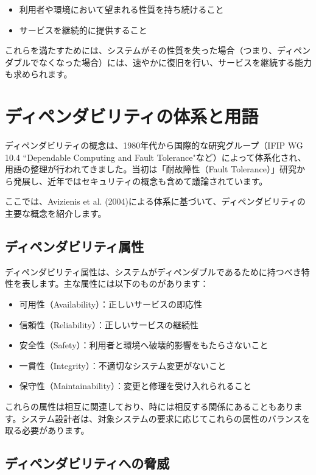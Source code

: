 \begin{itemize}
\item 利用者や環境において望まれる性質を持ち続けること
\item サービスを継続的に提供すること
\end{itemize}

これらを満たすためには、システムがその性質を失った場合（つまり、ディペンダブルでなくなった場合）には、速やかに復旧を行い、サービスを継続する能力も求められます。

\section{ディペンダビリティの体系と用語}

ディペンダビリティの概念は、1980年代から国際的な研究グループ（IFIP WG 10.4 ``Dependable Computing and Fault Tolerance"など）によって体系化され、用語の整理が行われてきました。当初は「耐故障性（Fault Tolerance）」研究から発展し、近年ではセキュリティの概念も含めて議論されています。

ここでは、Avizienis et al. (2004)による体系に基づいて、ディペンダビリティの主要な概念を紹介します。

\subsection{ディペンダビリティ属性}

ディペンダビリティ属性は、システムがディペンダブルであるために持つべき特性を表します。主な属性には以下のものがあります：

\begin{itemize}
\item 可用性（Availability）：正しいサービスの即応性
\item 信頼性（Reliability）：正しいサービスの継続性
\item 安全性（Safety）：利用者と環境へ破壊的影響をもたらさないこと
\item 一貫性（Integrity）：不適切なシステム変更がないこと
\item 保守性（Maintainability）：変更と修理を受け入れられること
\end{itemize}

これらの属性は相互に関連しており、時には相反する関係にあることもあります。システム設計者は、対象システムの要求に応じてこれらの属性のバランスを取る必要があります。

\subsection{ディペンダビリティへの脅威}

